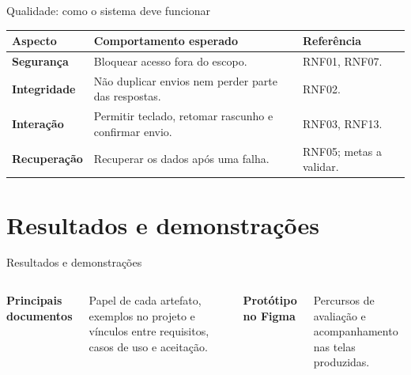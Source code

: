 \documentclass[aspectratio=169,t,xcolor=table]{beamer}
\newcommand{\head}[1]{\textcolor{UFGBlue}{\textbf{#1}}}
\newcommand{\num}[1]{{\fontsize{31}{34}\selectfont\bfseries\color{UFGBlue}#1}}
\begin{document}
\begin{frame}{Qualidade: como o sistema deve funcionar}

\small
\begin{tabularx}{\textwidth}{@{}L{.20\textwidth}YY@{}}
\toprule\head{Aspecto} & \head{Comportamento esperado} & \head{Referência}\\\midrule
\textbf{Segurança} & Bloquear acesso fora do escopo. & RNF01, RNF07.\\[.18cm]
\textbf{Integridade} & Não duplicar envios nem perder parte das respostas. & RNF02.\\[.18cm]
\textbf{Interação} & Permitir teclado, retomar rascunho e confirmar envio. & RNF03, RNF13.\\[.18cm]
\textbf{Recuperação} & Recuperar os dados após uma falha. & RNF05; metas a validar.\\\bottomrule
\end{tabularx}\par

\end{frame}

\section{Resultados e demonstrações}
\begingroup\sectionopeningtrue
{}
\begin{frame}{Resultados e demonstrações}
\begin{columns}[T,onlytextwidth]
\column{.46\textwidth}\num{01}\par\textbf{Principais documentos}\par\vspace{.25cm}Papel de cada artefato, exemplos no projeto e vínculos entre requisitos, casos de uso e aceitação.
\column{.46\textwidth}\num{02}\par\textbf{Protótipo no Figma}\par\vspace{.25cm}Percursos de avaliação e acompanhamento nas telas produzidas.
\end{columns}
\end{frame}
\endgroup
\end{document}
